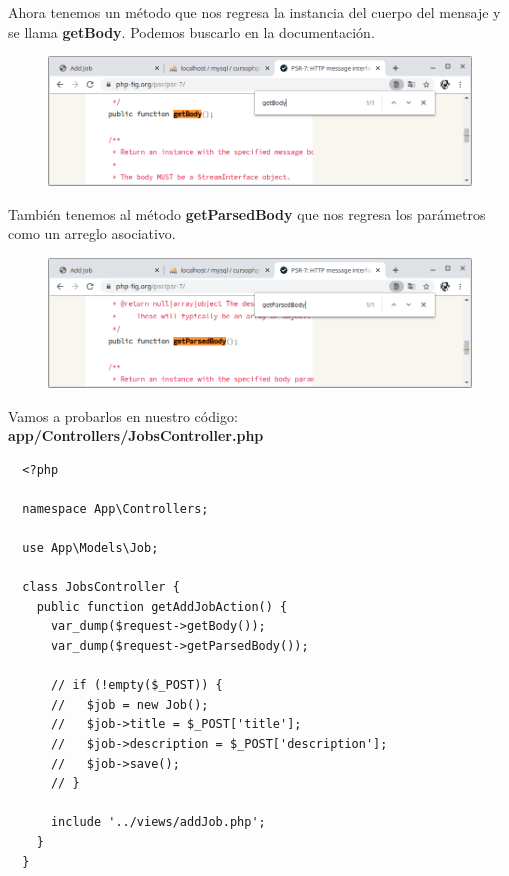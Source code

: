 \documentclass{article}
\begin{document}
Ahora tenemos un método que nos regresa la instancia del cuerpo del mensaje y
se llama \textbf{getBody}. Podemos buscarlo en la documentación.\\

\begin{figure}[h!]
  \centering
  \includegraphics[scale=0.5]{./Pictures/143_doc_getBody.png}
\end{figure}

También tenemos al método \textbf{getParsedBody} que nos regresa los parámetros
como un arreglo asociativo.\\

\newpage

\begin{figure}[h!]
  \centering
  \includegraphics[scale=0.5]{./Pictures/144_doc_getParsedBody.png}
\end{figure}

Vamos a probarlos en nuestro código:\\

\textbf{app/Controllers/JobsController.php}
\begin{verbatim}
  <?php

  namespace App\Controllers;

  use App\Models\Job;

  class JobsController {
    public function getAddJobAction() {
      var_dump($request->getBody());
      var_dump($request->getParsedBody());

      // if (!empty($_POST)) {
      //   $job = new Job();
      //   $job->title = $_POST['title'];
      //   $job->description = $_POST['description'];
      //   $job->save();
      // }

      include '../views/addJob.php';
    }
  }
\end{verbatim}
\end{document}
